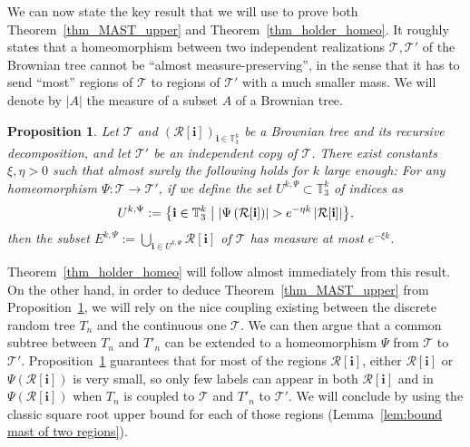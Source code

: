 \documentclass[JEP,XML,SOM,Unicode,NoFloatCountersInSection,published]{cedram}
\newcommand{\benstq}[2]{\bigl\{#1\bigm|#2\bigr\}}
\newcommand{\Tt}{\mathcal{T}}
\newcommand{\Rr}{\mathcal{R}}
\newcommand{\ii}{\mathbf{i}}
\theoremstyle{plain}
\newtheorem{proposition}[theorem]{Proposition}
\theoremstyle{definition}
\begin{document}
We can now state the key result that we will use to prove both Theorem~\ref{thm_MAST_upper} and Theorem~\ref{thm_holder_homeo}.
It roughly states that a homeomorphism between two independent rea\-lizations $\Tt, \Tt'$ of the Brownian tree cannot be ``almost measure-preserving'', in the sense that it has to send ``most'' regions of $\Tt$ to regions of $\Tt'$ with a much smaller mass. We will denote by $|A|$ the measure of a subset $A$ of a Brownian tree.
\begin{proposition}\label{prop_homeo_mass}
Let $\Tt$ and $\left( \Rr[\ii] \right)_{\ii \in \mathbb{T}_3^k}$ be a Brownian tree and its recursive decomposition, and let $\Tt'$ be an independent copy of $\Tt$. There exist constants $\xi, \eta>0$ such that almost surely the following holds for $k$ large enough:
For any homeomorphism $\Psi : \Tt \to \Tt'$,
if we define the set $U^{k,\Psi} \subset \mathbb{T}_3^k$ of indices as
\begin{align*}
U^{k,\Psi}:= \benstq{\ii \in \mathbb{T}_3^k}{\left| \Psi \left( \Rr[\ii] \right) \right| > e^{-\eta k} \left| \Rr[\ii] \right|},
\end{align*}
then the subset
$
E^{k,\Psi}:= \bigcup_{\ii \in U^{k,\Psi}} \Rr[\ii]$ of $\Tt
$
has measure at most $e^{-\xi k}$.
\end{proposition}
Theorem~\ref{thm_holder_homeo} will follow almost immediately from this result.
On the other hand, in order to deduce Theorem~\ref{thm_MAST_upper} from Proposition~\ref{prop_homeo_mass}, we will rely on the nice coupling existing between the discrete random tree $T_n$ and the continuous one $\Tt$.
We can then argue that a common subtree between $T_n$ and $T'_n$ can be extended to a homeomorphism $\Psi$ from $\Tt$ to $\Tt'$.
Proposition~\ref{prop_homeo_mass} guarantees that for most of the regions $\Rr[\ii]$, either $\Rr[\ii]$ or $\Psi(\Rr[\ii])$ is very small, so only few labels can appear in both $\Rr[\ii]$ and in $\Psi(\Rr[\ii])$ when $T_n$ is coupled to $\Tt$ and $T'_n$ to $\Tt'$. We will conclude by using the classic square root upper bound for each of those regions (Lemma~\ref{lem:bound mast of two regions}).
\end{document}
